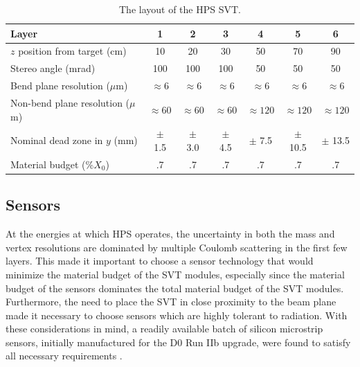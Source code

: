 \begin{table}
    \centering
    \begin{tabular}{lcccccc}  
        \toprule
        \textbf{Layer} & \textbf{1} & \textbf{2} & \textbf{3} & \textbf{4} & \textbf{5} & \textbf{6} \\
        \midrule
        \midrule
        $z$ position from target (cm)    & 10 & 20 & 30 & 50 & 70 & 90 \\
        Stereo angle (mrad) & 100 & 100 & 100 & 50 & 50 & 50 \\
        Bend plane resolution ($\mu$m) & $\approx$6 & $\approx$6 & $\approx$6 & $\approx$6 & $\approx$6 & $\approx$6 \\
        Non-bend plane resolution ($\mu$m) & $\approx60$ & $\approx60$ & $\approx60$ & $\approx120$ & $\approx120$ & $\approx120$ \\
        Nominal dead zone in $y$ (mm) & $\pm$ 1.5 & $\pm$ 3.0 & $\pm$ 4.5 & $\pm$ 7.5 & $\pm$ 10.5 & $\pm$ 13.5 \\ 
        Material budget (\%$X_0$) & .7 & .7 & .7 & .7 & .7 & .7 \\
        \bottomrule
    \end{tabular}
    \caption{The layout of the HPS SVT.}
    \label{tab:svt_layout}
\end{table}

\subsection{Sensors}

At the energies at which HPS operates, the uncertainty in both the mass and
vertex resolutions are dominated by multiple Coulomb scattering in the first 
few layers.  This made it important to choose a sensor technology that would 
minimize the material budget of the SVT modules, especially since the material
budget of the sensors dominates the total material budget of the SVT modules.
Furthermore, the need to place the SVT in close proximity
to the beam plane made it necessary to choose sensors which are highly tolerant
to radiation.  With these 
considerations in mind, a readily available batch of silicon microstrip sensors,
initially manufactured for the D0 Run IIb upgrade, were found to satisfy all 
necessary requirements \cite{D0Collab:2003}.

